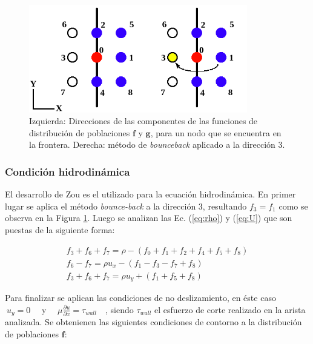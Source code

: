 \begin{figure}[h!]
	\centering
	\includegraphics[width=0.85\textwidth]{figs/cap2/CC_hidrodinamica.png}
	\caption{Izquierda: Direcciones de las componentes de las funciones de distribución de poblaciones $\mathbf{f}$ y $\mathbf{g}$, para un nodo que se encuentra en la frontera. Derecha: método de \textit{bounceback} aplicado a la dirección 3.}
	\label{fig:CC_hidro}
\end{figure}




\subsubsection{Condición hidrodinámica}

El desarrollo de Zou \cite{zou1997pressure} es el utilizado para la ecuación hidrodinámica. En primer lugar se aplica el método \textit{bounce-back} a la dirección 3, resultando $f_{3} = f_{1}$ como se observa en la Figura \ref{fig:CC_hidro}. Luego se analizan las Ec. (\ref{eq:rho}) y (\ref{eq:U}) que son puestas de la siguiente forma:

\begin{equation}
	\begin{array}{c}
	f_{3} + f_{6} + f_{7} = \rho - \left( f_{0} + f_{1} + f_{2} + f_{4} + f_{5} + f_{8}	 \right)\\
	f_{6} - f_{7} = \rho u_{x} - \left( f_{1} - f_{3} - f_{7} + f_{8} 	 \right)\\
	f_{3} + f_{6} + f_{7} = \rho u_{y} + \left( f_{1} + f_{5} + f_{8} \right)
	\end{array}
\end{equation}

Para finalizar se aplican las condiciones de no deslizamiento, en éste caso $\> u_{y} = 0\quad$ y $\quad\mu \frac{\partial u}{\partial x} = \tau_{wall}\quad$, siendo $\tau_{wall}$ el esfuerzo de corte realizado en la arista analizada. Se obtenienen las siguientes condiciones de contorno a la distribución de poblaciones $\mathbf{f}$:

